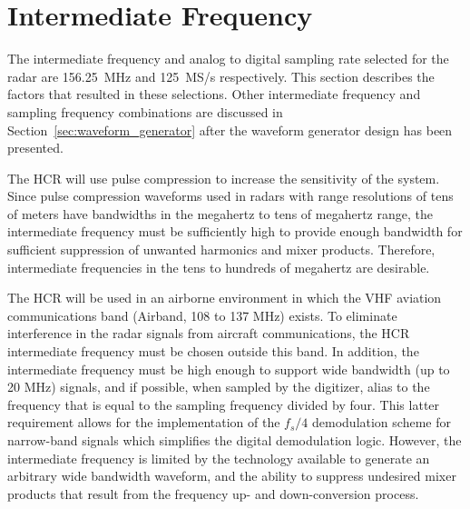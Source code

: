 \documentclass[12pt,letterpaper]{article}
\begin{document}

\section{Intermediate Frequency}
\label{sec:if_selection}

The intermediate frequency and analog to digital sampling rate
selected for the radar are 156.25~MHz and 125~MS/s respectively. This
section describes the factors that resulted in these selections. Other
intermediate frequency and sampling frequency combinations are
discussed in Section~\ref{sec:waveform_generator} after the waveform
generator design has been presented.

The HCR will use pulse compression to increase the sensitivity of the
system. Since pulse compression waveforms used in radars with range
resolutions of tens of meters have bandwidths in the megahertz to tens
of megahertz range, the intermediate frequency must be sufficiently
high to provide enough bandwidth for sufficient suppression of
unwanted harmonics and mixer products. Therefore, intermediate
frequencies in the tens to hundreds of megahertz are desirable.

The HCR will be used in an airborne environment in which the VHF
aviation communications band (Airband, 108 to 137 MHz) exists. To
eliminate interference in the radar signals from aircraft
communications, the HCR intermediate frequency must be chosen outside
this band. In addition, the intermediate frequency must be high enough
to support wide bandwidth (up to 20 MHz) signals, and if possible,
when sampled by the digitizer, alias to the frequency that is equal to
the sampling frequency divided by four. This latter requirement allows
for the implementation of the $f_s/4$ demodulation scheme for
narrow-band signals which simplifies the digital demodulation
logic. However, the intermediate frequency is limited by the
technology available to generate an arbitrary wide bandwidth waveform,
and the ability to suppress undesired mixer products that result from
the frequency up- and down-conversion process.
\end{document}
